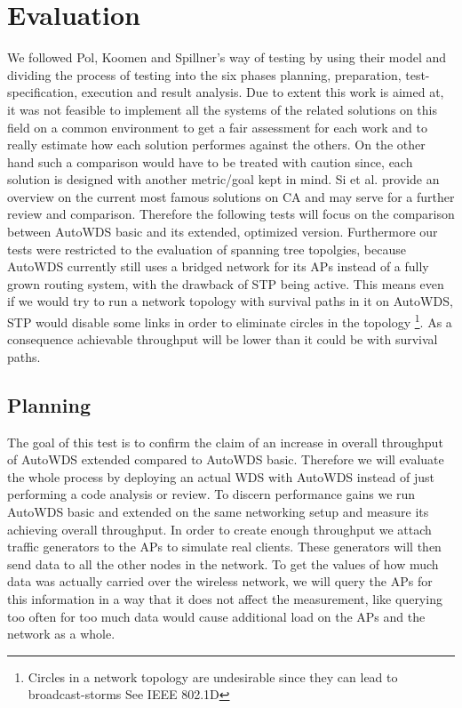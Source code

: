 \chapter{Evaluation}
We followed Pol, Koomen and Spillner's way of testing \cite{pol2000management} by using their model and dividing the process of testing into the 
six phases planning, preparation, test-specification, execution and result analysis. Due to extent this work is aimed at, 
it was not feasible to implement all the systems of the related solutions on this field on a common environment
to get a fair assessment for each work and to really estimate how each solution performes against the others. 
On the other hand such a comparison would have to be treated with caution since, each solution is designed with another metric/goal kept in mind.
Si et al. \cite{overview_caa} provide an overview on the current most famous solutions on \ac{CA} and may serve for a further review and comparison.
Therefore the following tests will focus on the comparison between AutoWDS basic and its extended, optimized version.
Furthermore our tests were restricted to the evaluation of spanning tree topolgies, because AutoWDS currently 
still uses a bridged network for its APs instead of a fully grown routing system, with the drawback of \ac{STP} being active.
This means even if we would try to run a network topology with survival paths in it on AutoWDS, \ac{STP} would disable some links in order to 
eliminate circles in the topology \footnote{Circles in a network topology are undesirable since they can lead to broadcast-storms See IEEE 802.1D}.
As a consequence achievable throughput will be lower than it could be with survival paths.

\newpage

  \section{Planning}
    The goal of this test is to confirm the claim of an increase in overall throughput of AutoWDS extended compared to AutoWDS basic.
    Therefore we will evaluate the whole process by deploying an actual \ac{WDS} with AutoWDS instead of just performing a code analysis or review.
    To discern performance gains we run AutoWDS basic and extended on the same networking setup and measure its achieving overall throughput.
    In order to create enough throughput we attach traffic generators to the APs to simulate real clients.
    These generators will then send data to all the other nodes in the network.
    To get the values of how much data was actually carried over the wireless network, we will query the APs for this information in a way that it 
    does not affect the measurement, like querying too often for too much data would cause additional load on the APs and the network as a whole.
    
